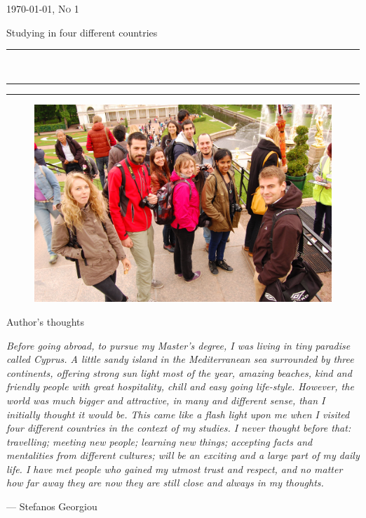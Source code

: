 \documentclass[10pt,a4paper]{article} %
\newcommand{\HorRule}[1]{\noindent\rule{\linewidth}{#1}} %
\newcommand{\SepRule}{\noindent	%
\begin{center}
\rule{250pt}{1pt} %
\end{center}
}
\newcommand{\NewsletterName}[1]{ %
\begin{center}
\Huge \usefont{T1}{fvs}{b}{n} %
#1
\end{center}	
\par \normalsize \normalfont}
\newcommand{\JournalIssue}[1]{ %
\hfill \textsc{\mydate \today, No #1} %
\par \normalsize \normalfont}
\newcommand{\NewsItem}[1]{ %
\usefont{T1}{fvs}{n}{n} %
\vspace{24pt}\large #1\vspace{3pt} %
\par \normalsize \normalfont}
\begin{document}
\JournalIssue{1} %

\NewsletterName{Studying in four different countries} %

\noindent\HorRule{3pt} \\[-0.75\baselineskip] %
\HorRule{1pt} %


\vspace{0.5cm}
\SepRule
\vspace{-0.5cm}

\begin{center}
\begin{minipage}[h]{0.75\linewidth}
\begin{figure}
\includegraphics[width=0.45 \textwidth]{media/front_picture.jpg}
\\
\end{figure}
	
\NewsItem{Author's thoughts} %
\vspace{3pt} %
\textit{
Before going abroad, to pursue my Master's degree, I was living in tiny 
paradise called Cyprus. 
A little sandy island in the Mediterranean sea surrounded by three continents, 
offering strong sun light most of the year, amazing beaches, kind and friendly people 
with great hospitality, chill and easy going life-style. 
However, the world was much bigger and attractive, in many and different sense, than 
I initially thought it would be.
This came like a flash light upon me when I visited four different countries 
in the context of my studies. 
I never thought before that: travelling; meeting new people; learning new things; 
accepting facts and mentalities from different cultures; will be an exciting and 
a large part of my daily life. 
I have met people who gained my utmost trust and respect, and no matter how far 
away they are now they are still close and always in my thoughts.   
}
\par\hfill --- Stefanos Georgiou
\end{minipage}
\end{center}
\end{document}
